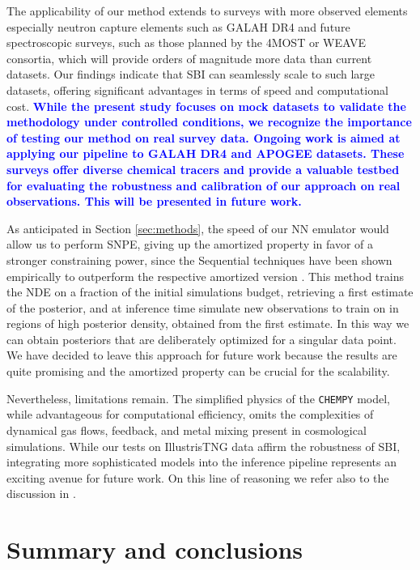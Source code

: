 \documentclass{aa}
\newcommand{\resub}[1]{\textbf{\textcolor{blue}{#1}}}
\begin{document}
The applicability of our method extends to surveys with more observed elements especially neutron capture elements such as GALAH DR4 \citep{Buder2024} and future spectroscopic surveys, such as those planned by the 4MOST \citep{4most} or WEAVE \citep{weave} consortia, which will provide orders of magnitude more data than current datasets. Our findings indicate that SBI can seamlessly scale to such large datasets, offering significant advantages in terms of speed and computational cost.
\resub{While the present study focuses on mock datasets to validate the methodology under controlled conditions, we recognize the importance of testing our method on real survey data. Ongoing work is aimed at applying our pipeline to GALAH DR4 and APOGEE datasets. These surveys offer diverse chemical tracers and provide a valuable testbed for evaluating the robustness and calibration of our approach on real observations. This will be presented in future work.}

As anticipated in Section \ref{sec:methods}, the speed of our NN emulator would allow us to perform SNPE, giving up the amortized property in favor of a stronger constraining power, since the Sequential techniques have been shown empirically to outperform the respective amortized version \citep{Ho2024}. This method trains the NDE on a fraction of the initial simulations budget, retrieving a first estimate of the posterior, and at inference time simulate new observations to train on in regions of high posterior density, obtained from the first estimate. In this way we can obtain posteriors that are deliberately optimized for a singular data point. We have decided to leave this approach for future work because the results are quite promising and the amortized property can be crucial for the scalability.

Nevertheless, limitations remain. The simplified physics of the \texttt{CHEMPY} model, while advantageous for computational efficiency, omits the complexities of dynamical gas flows, feedback, and metal mixing present in cosmological simulations. While our tests on IllustrisTNG data affirm the robustness of SBI, integrating more sophisticated models into the inference pipeline represents an exciting avenue for future work. On this line of reasoning we refer also to the discussion in \citet{Philcox_2019}.

\section{Summary and conclusions}
\label{sec: conclusion}
\end{document}
